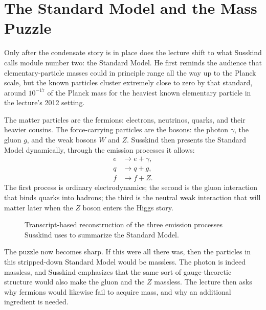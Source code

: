 \section{The Standard Model and the Mass Puzzle}

Only after the condensate story is in place does the lecture shift to what Susskind calls module number two: the Standard Model. He first reminds the audience that elementary-particle masses could in principle range all the way up to the Planck scale, but the known particles cluster extremely close to zero by that standard, around \(10^{-17}\) of the Planck mass for the heaviest known elementary particle in the lecture's 2012 setting.

The matter particles are the fermions: electrons, neutrinos, quarks, and their heavier cousins. The force-carrying particles are the bosons: the photon \(\gamma\), the gluon \(g\), and the weak bosons \(W\) and \(Z\). Susskind then presents the Standard Model dynamically, through the emission processes it allows:
\begin{align}
e &\to e+\gamma,\\
q &\to q+g,\\
f &\to f+Z.
\end{align}
The first process is ordinary electrodynamics; the second is the gluon interaction that binds quarks into hadrons; the third is the neutral weak interaction that will matter later when the \(Z\) boson enters the Higgs story.

\begin{figure}
\centering
{}
\caption{Transcript-based reconstruction of the three emission processes Susskind uses to summarize the Standard Model.}
\end{figure}

The puzzle now becomes sharp. If this were all there was, then the particles in this stripped-down Standard Model would be massless. The photon is indeed massless, and Susskind emphasizes that the same sort of gauge-theoretic structure would also make the gluon and the \(Z\) massless. The lecture then asks why fermions would likewise fail to acquire mass, and why an additional ingredient is needed.

